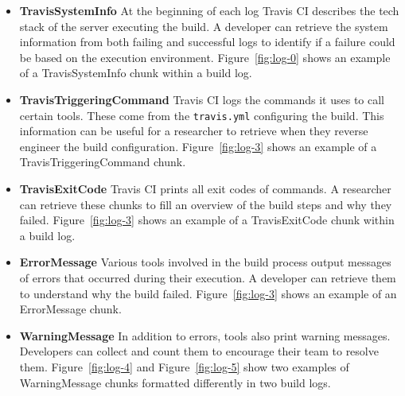 \documentclass[\myrootdir/main.tex]{subfiles}
\begin{document}
\begin{itemize}
	\item \textbf{TravisSystemInfo} At the beginning of each log Travis CI describes the tech stack of the server executing the build.
				A developer can retrieve the system information from both failing and successful logs to identify if a failure could be based on the execution environment.
	      Figure~\ref{fig:log-0} shows an example of a TravisSystemInfo chunk within a build log.

	\item \textbf{TravisTriggeringCommand} Travis CI logs the commands it uses to call certain tools.
	      These come from the \texttt{travis.yml} configuring the build.
				This information can be useful for a researcher to retrieve when they reverse engineer the build configuration.
	      Figure~\ref{fig:log-3} shows an example of a TravisTriggeringCommand chunk.

	\item \textbf{TravisExitCode} Travis CI prints all exit codes of commands.
				A researcher can retrieve these chunks to fill an overview of the build steps and why they failed.
	      Figure~\ref{fig:log-3} shows an example of a TravisExitCode chunk within a build log.

	\item \textbf{ErrorMessage} Various tools involved in the build process output messages of errors that occurred during their execution.
	      A developer can retrieve them to understand why the build failed.
	      Figure~\ref{fig:log-3} shows an example of an ErrorMessage chunk.

	\item \textbf{WarningMessage} In addition to errors, tools also print warning messages.
				Developers can collect and count them to encourage their team to resolve them.
	      Figure~\ref{fig:log-4} and Figure~\ref{fig:log-5} show two examples of WarningMessage chunks formatted differently in two build logs.

\end{itemize}
\end{document}
